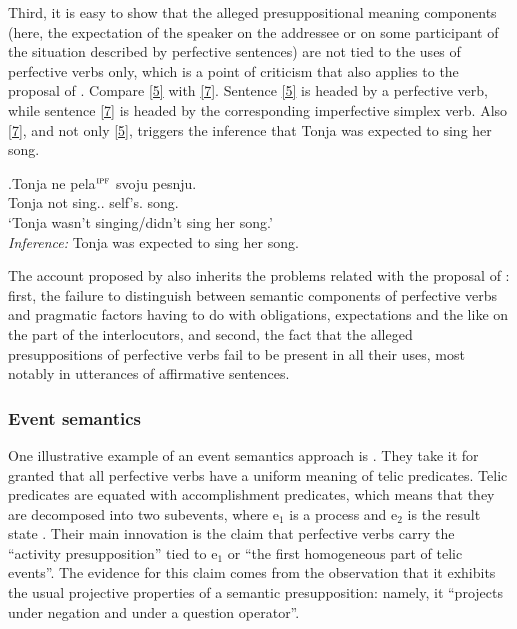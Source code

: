  Third, it is easy to show that the alleged presuppositional meaning components (here, the expectation of the speaker on the addressee or on some participant of the situation described by perfective sentences) are not tied to the uses of perfective verbs only, which is a point of criticism that also applies to the proposal of \citet{Paducheva:96}. Compare \ref{5} with \ref{7}. Sentence \ref{5} is headed by a perfective verb, while sentence \ref{7} is headed by the corresponding imperfective simplex verb. Also \ref{7}, and not only \ref{5}, triggers the inference that Tonja was expected to sing her song.

\exg.\label{7}Tonja ne pela$^{\textsc{ipf}}$ svoju pesnju.\\
 Tonja not sing.. self's. song.\\
 \trans `Tonja wasn't singing/didn't sing her song.'\\
\textit{Inference:} Tonja was expected to sing her song.

The account proposed by \citet{Romanova:06} also inherits the problems related with the proposal of \citet{Paducheva:96}: first, the failure to distinguish between semantic components of perfective verbs and pragmatic factors having to do with obligations, expectations and the like on the part of the interlocutors, and second, the fact that the alleged presuppositions of perfective verbs fail to be present in all their uses, most notably in utterances of affirmative sentences. 

\subsubsection{Event semantics}
One illustrative example of an event semantics approach is \citet{Docekal:09}. They take it for granted that all perfective verbs have a uniform meaning of telic predicates. Telic predicates are equated with accomplishment predicates, which means that they are decomposed into two subevents, where e$_1$ is a process and e$_2$ is the result state \citep[mainly following][]{Giorgi:01}. Their main innovation is the claim that perfective verbs carry the ``activity presupposition'' tied to e$_1$ or ``the first homogeneous part of telic events''. The evidence for this claim comes from the observation that it exhibits the usual projective properties of a semantic presupposition: namely, it ``projects under negation and under a question operator''.

